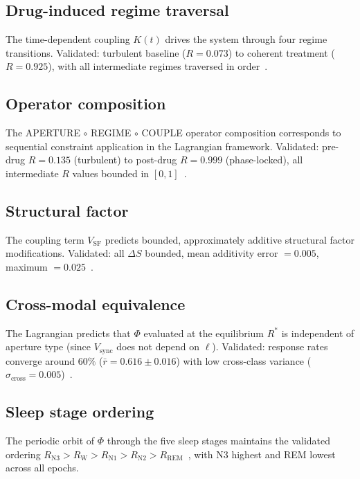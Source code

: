 \documentclass[twocolumn,aps,prl,superscriptaddress,floatfix]{revtex4-2}
\newcommand{\Pot}{\Phi}
\begin{document}
\subsection{Drug-induced regime traversal}

The time-dependent coupling $K(t)$ drives the system through four regime transitions.
Validated: turbulent baseline ($R = 0.073$) to coherent treatment ($R = 0.925$), with all intermediate regimes traversed in order~\cite{sachikonye2026aperture}.

\subsection{Operator composition}

The APERTURE $\circ$ REGIME $\circ$ COUPLE operator composition corresponds to sequential constraint application in the Lagrangian framework.
Validated: pre-drug $R = 0.135$ (turbulent) to post-drug $R = 0.999$ (phase-locked), all intermediate $R$ values bounded in $[0,1]$~\cite{sachikonye2026operator}.

\subsection{Structural factor}

The coupling term $V_{\mathrm{SF}}$ predicts bounded, approximately additive structural factor modifications.
Validated: all $\Delta S$ bounded, mean additivity error $= 0.005$, maximum $= 0.025$~\cite{sachikonye2026operator}.

\subsection{Cross-modal equivalence}

The Lagrangian predicts that $\Pot$ evaluated at the equilibrium $R^*$ is independent of aperture type (since $V_{\mathrm{sync}}$ does not depend on $\ell$).
Validated: response rates converge around $60\%$ ($\bar{r} = 0.616 \pm 0.016$) with low cross-class variance ($\sigma_{\mathrm{cross}} = 0.005$)~\cite{sachikonye2026aperture}.

\subsection{Sleep stage ordering}

The periodic orbit of $\Pot$ through the five sleep stages maintains the validated ordering $R_{\mathrm{N3}} > R_{\mathrm{W}} > R_{\mathrm{N1}} > R_{\mathrm{N2}} > R_{\mathrm{REM}}$~\cite{sachikonye2026regime}, with N3 highest and REM lowest across all epochs.
\end{document}
